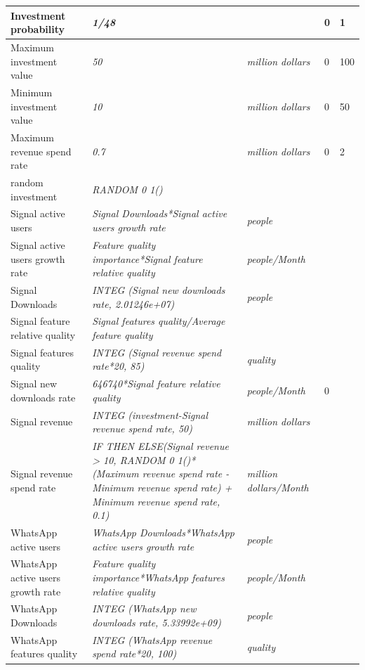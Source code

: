 \begin{table}[h]
\begin{adjustbox}{width=1\textwidth}
\begin{tabular}{|l|l|l|l|l|}
   Investment probability & \textit{1/48} &  & 0 & 1  \\\hline
   Maximum investment value & \textit{50} & \textit{million dollars} & 0 & 100 \\\hline
   Minimum investment value & \textit{10} & \textit{million dollars} & 0 & 50 \\\hline
   Maximum revenue spend rate & \textit{0.7} & \textit{million dollars} & 0 & 2 \\\hline
   random investment & \textit{RANDOM 0 1()} &  &  &  \\\hline
   Signal active users & \textit{Signal Downloads*Signal active users growth rate} & \textit{people} &  &  \\\hline
   Signal active users growth rate & \textit{Feature quality importance*Signal feature relative quality} & \textit{people/Month} &  &  \\\hline
   Signal Downloads & \textit{INTEG (Signal new downloads rate, 2.01246e+07)} & \textit{people} &  &  \\\hline
   Signal feature relative quality & \textit{Signal features quality/Average feature quality} &  &  &  \\\hline
   Signal features quality & \textit{INTEG (Signal revenue spend rate*20, 85)} & \textit{quality} &  &  \\\hline
   Signal new downloads rate & \textit{646740*Signal feature relative quality} & \textit{people/Month} & 0 &  \\\hline
   Signal revenue & \textit{INTEG (investment-Signal revenue spend rate, 50)} & \textit{million dollars} &  &  \\\hline
   Signal revenue spend rate & \makecell[l]{\textit{IF THEN ELSE(Signal revenue > 10, RANDOM 0 1()*(Maximum revenue spend rate -} \\ \textit{Minimum revenue spend rate) + Minimum revenue spend rate, 0.1)}} & \textit{million dollars/Month} &  &  \\\hline
   WhatsApp active users & \textit{WhatsApp Downloads*WhatsApp active users growth rate} & \textit{people} &  &  \\\hline
   WhatsApp active users growth rate & \textit{Feature quality importance*WhatsApp features relative quality} & \textit{people/Month} &  &  \\\hline
   WhatsApp Downloads & \textit{INTEG (WhatsApp new downloads rate, 5.33992e+09)} & \textit{people} &  &  \\\hline
   WhatsApp features quality & \textit{INTEG (WhatsApp revenue spend rate*20, 100)} & \textit{quality} &  &  \\\hline

\end{tabular}
\end{adjustbox}
\end{table}
